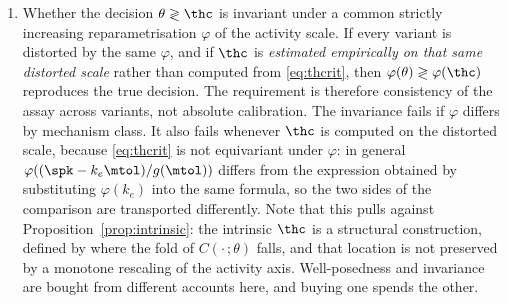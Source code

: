 \begin{enumerate}[leftmargin=*, itemsep=2pt]
      Two patients matched at $\bar m$ and sharing $K_m$ separate exactly:
      \begin{equation}
      \mu_A - \mu_B \;=\; (k_{e,A} - k_{e,B})\,(\mtol - \bar m),
      \label{eq:musplit}
      \end{equation}
      since point-matching forces
      $\theta_A - \theta_B = -(k_{e,A} - k_{e,B})(K_m + \bar m)$. Two observationally
      identical patients diverge linearly in how far the tolerable level sits above the
      operating point, and coincide when $\mtol = \bar m$.
\item Whether the decision $\theta \gtrless \thc$ is invariant under a common strictly
      increasing reparametrisation $\varphi$ of the activity scale. If every variant is
      distorted by the same $\varphi$, and if $\thc$ is \emph{estimated empirically on that
      same distorted scale} rather than computed from \eqref{eq:thcrit}, then
      $\varphi(\theta) \gtrless \varphi(\thc)$ reproduces the true decision. The
      requirement is therefore consistency of the assay across variants, not absolute
      calibration. The invariance fails if $\varphi$ differs by mechanism class. It also
      fails whenever $\thc$ is computed on the distorted scale,
      because \eqref{eq:thcrit} is not equivariant under $\varphi$: in general
      $\varphi\!\left((\spk - k_e \mtol)/g(\mtol)\right)$ differs from the expression
      obtained by substituting $\varphi(k_e)$ into the same formula, so the two sides of
      the comparison are transported differently. Note that this pulls against
      Proposition~\ref{prop:intrinsic}: the intrinsic $\thc$ is a structural construction,
      defined by where the fold of $C(\cdot\,;\theta)$ falls, and that location is not
      preserved by a monotone rescaling of the activity axis. Well-posedness and
      invariance are bought from different accounts here, and buying one spends the
      other.
\end{enumerate}

